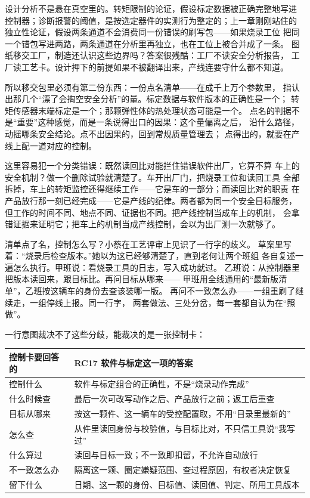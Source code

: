 设计分析不是悬在真空里的。转矩限制的论证，假设标定数据被正确完整地写进
控制器；诊断报警的阈值，是按选定器件的实测行为整定的；上一章刚刚站住的
独立性论证，假设两条通道不会消费同一份错误的刷写包——如果烧录工位
把同一个错包写进两路，两条通道在分析里再独立，也在工位上被合并成了一条。
图纸移交工厂，制造还认识这些边界吗？答案很残酷：工厂不读安全分析报告，
工厂读工艺卡。设计押下的前提如果不被翻译出来，产线连要守什么都不知道。

所以移交包里必须有第二份东西：一份点名清单——在成千上万个参数里，
指认出那几个“漂了会掏空安全分析”的量。标定数据与软件版本的正确性是一个；
转矩传感器末端标定是一个；那颗弹性体的热处理状态可能是一个。
点名的判据不是“重要”这种感觉，而是一条说得出口的因果：这个量偏离之后，
沿什么路径，动摇哪条安全结论。点不出因果的，回到常规质量管理去；
点得出的，就要在产线上配一道对应的控制。

这里容易犯一个分类错误：既然读回比对能拦住错误软件出厂，它算不算
车上的安全机制？做一个删除试验就清楚了。车开出厂门，把烧录工位和读回工具
全部拆掉，车上的转矩监控还得继续工作——它是车的一部分；而读回比对的职责
在产品放行那一刻已经完成——它是产线的纪律。两者都为同一个安全目标服务，
但工作的时间不同、地点不同、证据也不同。把产线控制当成车上的机制，
会拿错证据来证明它；把车上的机制当成产线控制，会以为出厂测一次就够了。

清单点了名，控制怎么写？小蔡在工艺评审上见识了一行字的歧义。
草案里写着：“烧录后检查版本。”她以为这已经够清楚了，直到老何让两个班组
各自复述一遍怎么执行。甲班说：看烧录工具的日志，写入成功就过。
乙班说：从控制器里把版本读回来，跟目标比。再问目标从哪来——
甲班用全线通用的“最新版清单”，乙班按这辆车的身份去查该装哪一版。
再问不一致怎么办——一组重刷了继续走，一组停线上报。同一行字，
两套做法、三处分岔，每一套都自认为在“照做”。

一行意图裁决不了这些分歧，能裁决的是一张控制卡：

\begin{center}
\begingroup\small
\setlength{\tabcolsep}{4pt}
\begin{tabularx}{\linewidth}{@{}XX@{}}
\toprule
控制卡要回答的 & RC17 软件与标定这一项的答案 \\
\midrule
控制什么 & 软件与标定组合的正确性，不是“烧录动作完成” \\
什么时候查 & 最后一次可改写动作之后、产品放行之前；返工后重查 \\
目标从哪来 & 按这一颗件、这一辆车的受控配置取，不用“目录里最新的” \\
怎么查 & 从件里读回身份与校验值，与目标比对，不只信工具说“我写过” \\
什么算过 & 读回与目标一致；不一致即扣留，不允许自动放行 \\
不一致怎么办 & 隔离这一颗、圈定嫌疑范围、查过程原因，有权者决定恢复 \\
留下什么 & 日期、这一颗的身份、目标值、读回值、判定、所用工具版本 \\
\bottomrule
\end{tabularx}
\endgroup
\end{center}

